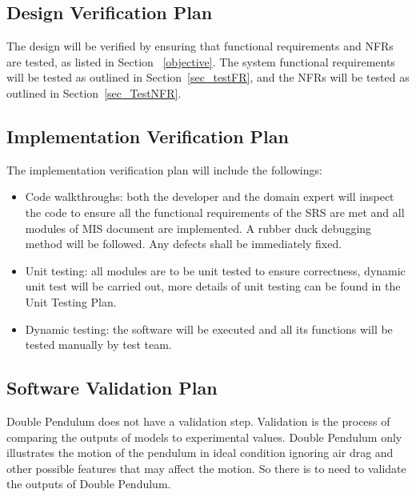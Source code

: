 \documentclass[12pt, titlepage]{article}
\begin{document}
\subsection{Design Verification Plan}

The design will be verified by ensuring that functional requirements and NFRs are tested, as listed in Section ~\ref{objective}. The system functional requirements will be tested as outlined in Section~\ref{sec_testFR}, and the NFRs will be tested as outlined in Section~\ref{sec_TestNFR}. 

 

\subsection{Implementation Verification Plan}

The implementation verification plan will include the followings:
\begin{itemize}
    \item Code walkthroughs: both the developer and the domain expert will
inspect the code to ensure all the functional requirements of the SRS are met and all modules of MIS document are implemented. A rubber duck debugging method will be followed. Any defects shall be immediately fixed.   
    \item Unit testing: all modules are to be unit tested to ensure correctness, dynamic unit test will be carried out, more details of unit testing can be found in the Unit Testing Plan.  
    \item Dynamic testing: the software will be executed and all its functions
will be tested manually by test team.
\end{itemize}


\subsection{Software Validation Plan}
Double Pendulum does not have a validation step. Validation is the process of comparing the outputs of models to experimental values. Double Pendulum only illustrates the motion of the pendulum in ideal condition ignoring air drag and other possible features that may affect the motion. So there is to need to validate the outputs of Double Pendulum. 
  
\end{document}
